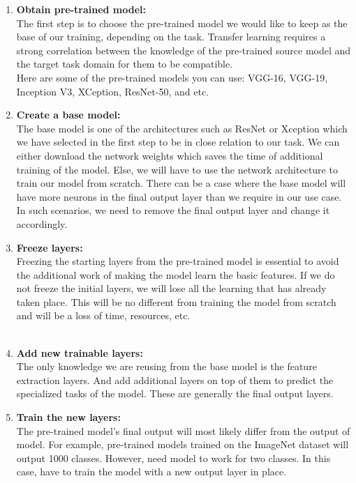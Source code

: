 \begin{enumerate}
    \item {\bf Obtain pre-trained model:} \\[3pt]
        The first step is to choose the pre-trained model we would like to 
        keep as the base of our training, depending on the task. Transfer 
        learning requires a strong correlation between the knowledge of 
        the pre-trained source model and the target task domain for them 
        to be compatible. \\
        Here are some of the pre-trained models you can 
        use: VGG-16, VGG-19, Inception V3, XCeption, ResNet-50, and etc.

    \item {\bf Create a base model:} \\[3pt]
        The base model is one of the architectures such as ResNet or Xception which 
        we have selected in the first step to be in close relation to our task. We can 
        either download the network weights which saves the time of additional training 
        of the model. Else, we will have to use the network architecture to train our 
        model from scratch. There can be a case where the base model will have more 
        neurons in the final output layer than we require in our use case. In such 
        scenarios, we need to remove the final output layer and change it accordingly.

    \item {\bf Freeze layers:} \\[3pt]
        Freezing the starting layers from the pre-trained model is essential to 
        avoid the additional work of making the model learn the basic features.
        If we do not freeze the initial layers, we will lose all the learning 
        that has already taken place. This will be no different from training 
        the model from scratch and will be a loss of time, resources, etc. \\\\

    \item {\bf Add new trainable layers:} \\[3pt]
        The only knowledge we are reusing from the base model is the feature 
        extraction layers. And add additional layers on top of them to predict 
        the specialized tasks of the model. These are generally the final output layers.

    \item {\bf Train the new layers:} \\[3pt]
        The pre-trained model's final output will most likely differ from the output of 
        model. For example, pre-trained models trained on the ImageNet dataset will output 
        1000 classes. However, need model to work for two classes. In this case, have to 
        train the model with a new output layer in place.


\end{enumerate}
